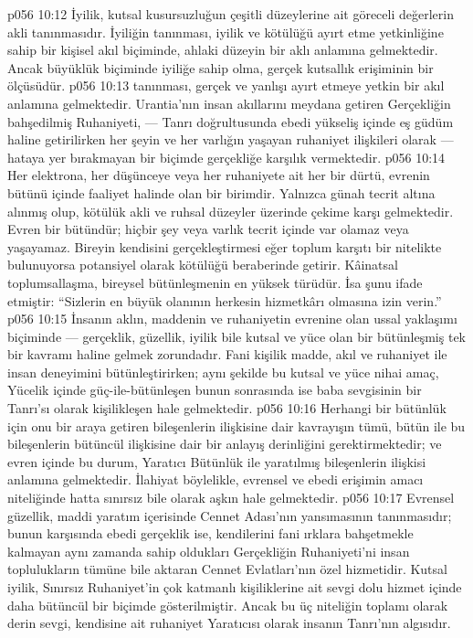 \vs p056 10:12 İyilik, kutsal kusursuzluğun çeşitli düzeylerine ait göreceli değerlerin akli tanınmasıdır. İyiliğin tanınması, iyilik ve kötülüğü ayırt etme yetkinliğine sahip bir kişisel akıl biçiminde, ahlaki düzeyin bir aklı anlamına gelmektedir. Ancak büyüklük biçiminde iyiliğe sahip olma, gerçek kutsallık erişiminin bir ölçüsüdür.
\vs p056 10:13  tanınması, gerçek ve yanlışı ayırt etmeye yetkin bir akıl anlamına gelmektedir. Urantia’nın insan akıllarını meydana getiren Gerçekliğin bahşedilmiş Ruhaniyeti, --- Tanrı doğrultusunda ebedi yükseliş içinde eş güdüm haline getirilirken her şeyin ve her varlığın yaşayan ruhaniyet ilişkileri olarak --- hataya yer bırakmayan bir biçimde gerçekliğe karşılık vermektedir.
\vs p056 10:14 Her elektrona, her düşünceye veya her ruhaniyete ait her bir dürtü, evrenin bütünü içinde faaliyet halinde olan bir birimdir. Yalnızca günah tecrit altına alınmış olup, kötülük akli ve ruhsal düzeyler üzerinde çekime karşı gelmektedir. Evren bir bütündür; hiçbir şey veya varlık tecrit içinde var olamaz veya yaşayamaz. Bireyin kendisini gerçekleştirmesi eğer toplum karşıtı bir nitelikte bulunuyorsa potansiyel olarak kötülüğü beraberinde getirir. Kâinatsal toplumsallaşma, bireysel bütünleşmenin en yüksek türüdür. İsa şunu ifade etmiştir: “Sizlerin en büyük olanının herkesin hizmetkârı olmasına izin verin.”
\vs p056 10:15 İnsanın aklın, maddenin ve ruhaniyetin evrenine olan ussal yaklaşımı biçiminde --- gerçeklik, güzellik, iyilik bile kutsal ve yüce olan bir bütünleşmiş tek bir kavramı haline gelmek zorundadır. Fani kişilik madde, akıl ve ruhaniyet ile insan deneyimini bütünleştirirken; aynı şekilde bu kutsal ve yüce nihai amaç, Yücelik içinde güç\hyp{}ile\hyp{}bütünleşen bunun sonrasında ise baba sevgisinin bir Tanrı’sı olarak kişilikleşen hale gelmektedir.
\vs p056 10:16 Herhangi bir bütünlük için onu bir araya getiren bileşenlerin ilişkisine dair kavrayışın tümü, bütün ile bu bileşenlerin bütüncül ilişkisine dair bir anlayış derinliğini gerektirmektedir; ve evren içinde bu durum, Yaratıcı Bütünlük ile yaratılmış bileşenlerin ilişkisi anlamına gelmektedir. İlahiyat böylelikle, evrensel ve ebedi erişimin amacı niteliğinde hatta sınırsız bile olarak aşkın hale gelmektedir.
\vs p056 10:17 Evrensel güzellik, maddi yaratım içerisinde Cennet Adası’nın yansımasının tanınmasıdır; bunun karşısında ebedi gerçeklik ise, kendilerini fani ırklara bahşetmekle kalmayan aynı zamanda sahip oldukları Gerçekliğin Ruhaniyeti’ni insan toplulukların tümüne bile aktaran Cennet Evlatları’nın özel hizmetidir. Kutsal iyilik, Sınırsız Ruhaniyet’in çok katmanlı kişiliklerine ait sevgi dolu hizmet içinde daha bütüncül bir biçimde gösterilmiştir. Ancak bu üç niteliğin toplamı olarak derin sevgi, kendisine ait ruhaniyet Yaratıcısı olarak insanın Tanrı’nın algısıdır.
